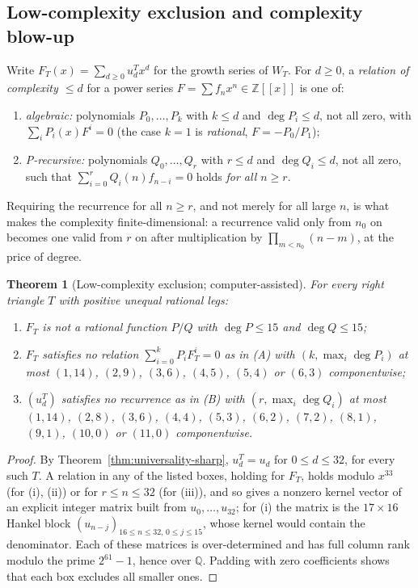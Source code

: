 \documentclass[11pt]{article}
\theoremstyle{plain}
\newtheorem{theorem}{Theorem}
\theoremstyle{definition}
\theoremstyle{remark}
\newcommand{\Z}{\mathbb{Z}}
\newcommand{\Q}{\mathbb{Q}}
\begin{document}
\subsection{Low-complexity exclusion and complexity blow-up}

Write $F_T(x)=\sum_{d\ge0}u_d^Tx^d$ for the growth series of $W_T$. For
$d\ge0$, a \emph{relation of complexity $\le d$} for a power series
$F=\sum f_nx^n\in\Z[[x]]$ is one of:
\begin{enumerate}[label=\textup{(\Alph*)},itemsep=0.1em]
\item \emph{algebraic:} polynomials $P_0,\dots,P_k$ with $k\le d$ and
$\deg P_i\le d$, not all zero, with $\sum_iP_i(x)F^i=0$ (the case $k=1$ is
\emph{rational}, $F=-P_0/P_1$);
\item \emph{P-recursive:} polynomials $Q_0,\dots,Q_r$ with $r\le d$ and
$\deg Q_i\le d$, not all zero, such that
$\sum_{i=0}^rQ_i(n)f_{n-i}=0$ holds \emph{for all $n\ge r$}.
\end{enumerate}
Requiring the recurrence for all $n\ge r$, and not merely for all large $n$,
is what makes the complexity finite-dimensional: a recurrence valid only from
$n_0$ on becomes one valid from $r$ on after multiplication by
$\prod_{m<n_0}(n-m)$, at the price of degree.

\begin{theorem}[Low-complexity exclusion; computer-assisted]
\label{thm:WT-lowcomplexity}
For every right triangle $T$ with positive unequal rational legs:
\begin{enumerate}[label=\textup{(\roman*)},itemsep=0.1em]
\item $F_T$ is not a rational function $P/Q$ with $\deg P\le15$ and $\deg Q\le15$;
\item $F_T$ satisfies no relation $\sum_{i=0}^kP_iF_T^i=0$ as in \textup{(A)}
with $(k,\max_i\deg P_i)$ at most $(1,14)$, $(2,9)$, $(3,6)$, $(4,5)$,
$(5,4)$ or $(6,3)$ componentwise;
\item $(u_d^T)$ satisfies no recurrence as in \textup{(B)} with
$(r,\max_i\deg Q_i)$ at most $(1,14)$, $(2,8)$, $(3,6)$, $(4,4)$, $(5,3)$,
$(6,2)$, $(7,2)$, $(8,1)$, $(9,1)$, $(10,0)$ or $(11,0)$ componentwise.
\end{enumerate}
\end{theorem}

\begin{proof}
By Theorem~\ref{thm:universality-sharp}, $u_d^T=u_d$ for $0\le d\le32$, for
every such $T$. A relation in any of the listed boxes, holding for $F_T$,
holds modulo $x^{33}$ (for (i), (ii)) or for $r\le n\le32$ (for (iii)), and so
gives a nonzero kernel vector of an explicit integer matrix built from
$u_0,\dots,u_{32}$; for (i) the matrix is the $17\times16$ Hankel block
$(u_{n-j})_{16\le n\le32,\,0\le j\le15}$, whose kernel would contain the
denominator. Each of these matrices is over-determined and has full column
rank modulo the prime $2^{61}-1$, hence over $\Q$. Padding with zero
coefficients shows that each box excludes all smaller ones.
\end{proof}
\end{document}
